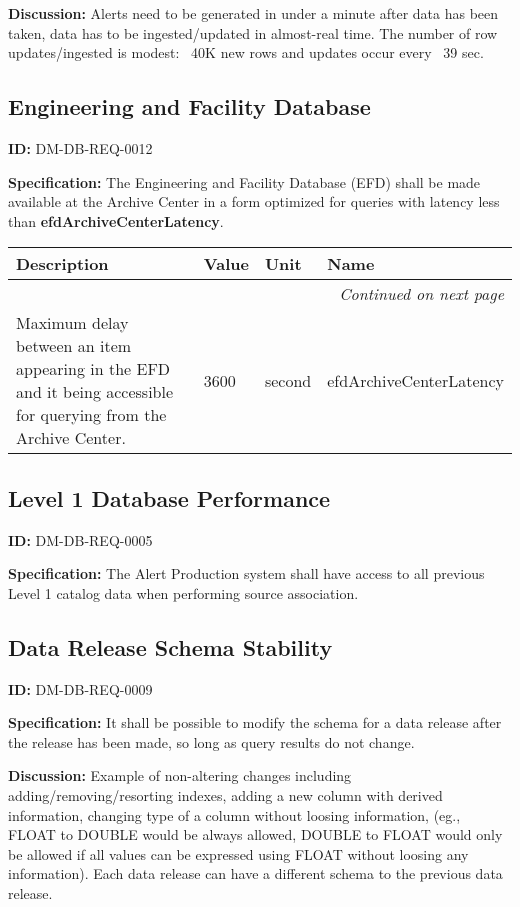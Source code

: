 \documentclass[SE,toc,lsstdraft]{lsstdoc}
\makeatletter
\newcommand{\paramname}[1]{\hspace{0pt}#1}
\newcommand{\unitname}[1]{\hspace{0pt}#1}
\newenvironment{parameters}[0]{%
\setlength\LTleft{0pt}
\setlength\LTright{\fill}
\begin{small}
\begin{longtable}[]{|p{0.49\textwidth}|l|p{0.6in}|p{1.70in}@{}|}

\hline \textbf{Description} & \textbf{Value} & \textbf{Unit} & \textbf{Name} \\ \hline
\endhead

\hline \multicolumn{4}{r}{\emph{Continued on next page}} \\
\endfoot

\hline\hline
\endlastfoot
}{%
\hline
\end{longtable}
\end{small}
}
\makeatother
\begin{document}
\textbf{Discussion:}
Alerts need to be generated in under a minute after data has been taken, data has to be ingested/updated in almost-real time. The number of row updates/ingested is modest: ~40K new rows and updates occur every ~39 sec.

\subsection{Engineering and Facility Database}

\label{DM-DB-REQ-0012}
\textbf{ID:} DM-DB-REQ-0012

\textbf{Specification:}
The Engineering and Facility Database (EFD) shall be made available at the Archive Center in a form optimized for queries with latency less than \textbf{efdArchiveCenterLatency}.

\begin{parameters}
Maximum delay between an item appearing in the EFD and it being accessible for querying from the Archive Center.
&
3600
&
\unitname{%
second
}
&
\paramname{%
efdArchiveCenterLatency
} \\\hline
\end{parameters}

\subsection{Level 1 Database Performance}

\label{DM-DB-REQ-0005}
\textbf{ID:} DM-DB-REQ-0005

\textbf{Specification:}
The Alert Production system shall have access to all previous Level 1 catalog data when performing source association.

\subsection{Data Release Schema Stability}

\label{DM-DB-REQ-0009}
\textbf{ID:} DM-DB-REQ-0009

\textbf{Specification:}
It shall be possible to modify the schema for a data release after the release has been made, so long as query results do not change.

\textbf{Discussion:}
Example of non-altering changes including adding/removing/resorting indexes, adding a new column with derived information, changing type of a column without loosing information, (eg., FLOAT to DOUBLE would be always allowed, DOUBLE to FLOAT would only be allowed if all values can be expressed using FLOAT without loosing any information). Each data release can have a different schema to the previous data release.
\end{document}
